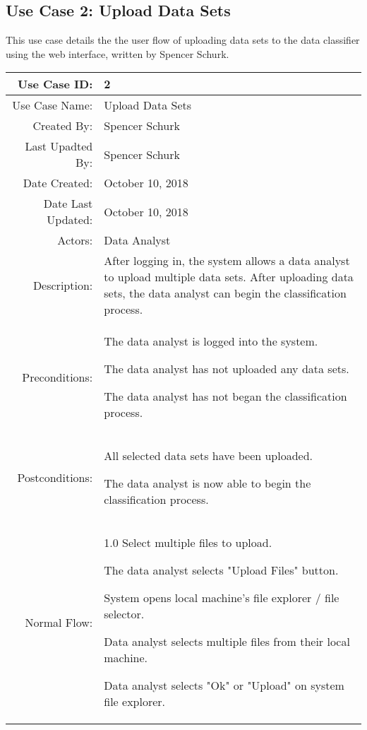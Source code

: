 \documentclass[12pt,oneside,letterpaper]{article}
\newenvironment{packed_enumerate}{ %
\vspace{-7mm}
\begin{enumerate}
  \setlength{\itemsep}{0pt}
  \setlength{\parskip}{0pt}
  \setlength{\parsep}{0pt}
}{\end{enumerate}
\vspace{-8mm}}
\begin{document}
\subsection{\label{Upload Data Sets}Use Case 2: Upload Data Sets}
This use case details the the user flow of uploading data sets to the data classifier using the web interface, written by Spencer Schurk.

\begin{longtable}{|r|p{3.8in}|}
\hline
Use Case ID:&2\\
\hline
Use Case Name:&Upload Data Sets\\
\hline
Created By:&Spencer Schurk\\
\hline
Last Upadted By:&Spencer Schurk\\
\hline
Date Created:&October 10, 2018\\
\hline
Date Last Updated:&October 10, 2018\\
\hline
Actors:&Data Analyst\\
\hline
Description:&After logging in, the system allows a data analyst to upload multiple data sets. After uploading data sets, the data analyst can begin the classification process.\\
\hline
Preconditions:&\begin{packed_enumerate}
\item The data analyst is logged into the system.
\item The data analyst has not uploaded any data sets.
\item The data analyst has not began the classification process.
\end{packed_enumerate}\\
\hline
Postconditions:&\begin{packed_enumerate}
\item All selected data sets have been uploaded.
\item The data analyst is now able to begin the classification process.
\end{packed_enumerate}\\
\hline
Normal Flow:&1.0 Select multiple files to upload.\newline
\begin{packed_enumerate}
\item The data analyst selects "Upload Files" button.
\item System opens local machine's file explorer / file selector.
\item Data analyst selects multiple files from their local machine.
\item Data analyst selects "Ok" or "Upload" on system file explorer.

\end{packed_enumerate}
\end{longtable}
\end{document}
